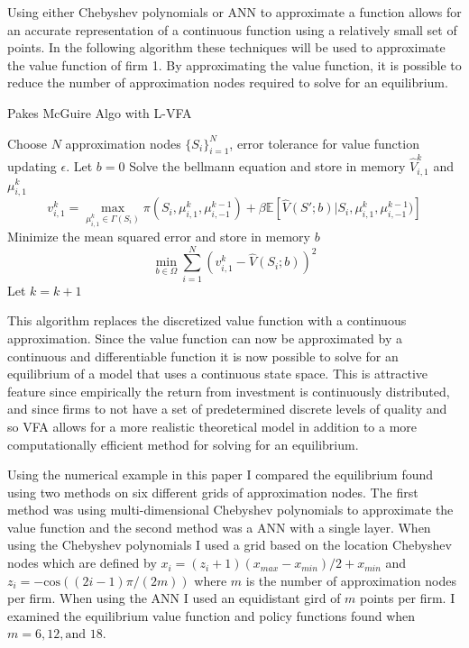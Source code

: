 \documentclass[12pt]{article}
\newcommand{\norm}[1]{\left\lVert#1\right\rVert}
\begin{document}
Using either Chebyshev polynomials or ANN to approximate a function allows for an accurate representation of a continuous function using a relatively small set of points. In the following algorithm these techniques will be used to approximate the value function of firm 1. By approximating the value function, it is possible to reduce the number of approximation nodes required to solve for an equilibrium.

\begin{algorithm}[H]
  \caption{Pakes McGuire Algo with L-VFA}
  \begin{algorithmic}[1]
    \Procedure{}{} Choose $N$ approximation nodes $\{S_i\}_{i=1}^N$, error tolerance for value function updating $\epsilon$.
    \State Let $b=0$
    \While{$\norm{\hat{V}^{k}_1-\hat{V}^{k-1}_1} > \frac{\epsilon (1-\beta)}{2\beta}$}
    \State Solve the bellmann equation and store in memory $\hat{V}^k_{i,1}$ and $\mu^k_{i,1}$
    \begin{equation*}
      v^k_{i,1}=\max_{\mu^k_{i,1} \in \Gamma(S_i)} \pi(S_i, \mu^k_{i,1}, \mu^{k-1}_{i,-1})+ \beta\mathbb{E}[\hat{V}(S';b)|S_i,\mu^k_{i,1},\mu^{k-1}_{i,-1})]
    \end{equation*}
    \State Minimize the mean squared error and store in memory $b$
    \begin{equation*}
      \min_{b \in \Omega} \sum_{i=1}^N (v^k_{i,1} - \hat{V}(S_i;b))^2
    \end{equation*}
    \State Let $k=k+1$
    \EndFor
    \EndWhile
    \EndProcedure
  \end{algorithmic}
\end{algorithm}

This algorithm replaces the discretized value function with a continuous approximation. Since the value function can now be approximated by a continuous and differentiable function it is now possible to solve for an equilibrium of a model that uses a continuous state space. This is attractive feature since empirically the return from investment is continuously distributed, and since firms to not have a set of predetermined discrete levels of quality and so VFA allows for a more realistic theoretical model in addition to a more computationally efficient method for solving for an equilibrium.

Using the numerical example in this paper I compared the equilibrium found using two methods on six different grids of approximation nodes. The first method was using multi-dimensional Chebyshev polynomials to approximate the value function and the second method was a ANN with a single layer. When using the Chebyshev polynomials I used a grid based on the location Chebyshev nodes which are defined by $x_i=(z_i+1)(x_{max}-x_{min})/2+x_{min}$ and $z_i=-\text{cos}((2i-1)\pi/(2m))$ where $m$ is the number of approximation nodes per firm. When using the ANN I used an equidistant gird of $m$ points per firm. I examined the equilibrium value function and policy functions found when $m=6,12,\text{and }18$.
\end{document}
